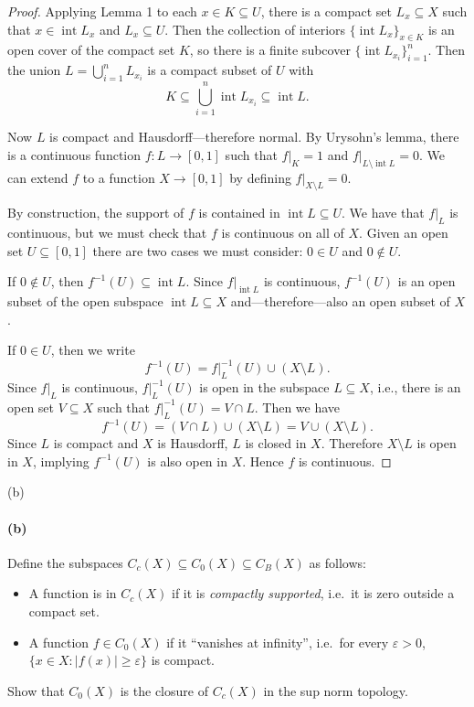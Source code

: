 \documentclass[12pt]{article}
\newlength{\myparskip}
\newenvironment{fullbox}{\begin{lrbox}{\savefullbox}\begin{minipage}{\dimexpr\textwidth-2\fboxsep\relax}\setlength{\parskip}{\myparskip}}{\end{minipage}\end{lrbox}\framebox[\textwidth]{\usebox{\savefullbox}}}
\newenvironment{pbox}[1][]{\begin{fullbox}\ifx#1\empty\else\paragraph{#1}\fi}{\end{fullbox}}
\theoremstyle{definition}
\newcommand{\eps}{\varepsilon}
\newcommand{\<}{\langle}
\renewcommand{\>}{\rangle}
\DeclareMathOperator{\inter}{int}
\begin{document}
\begin{proof}
    Applying Lemma 1 to each $x \in K \subseteq U$, there is a compact set $L_x \subseteq X$ such that $x \in \inter L_x$ and $L_x \subseteq U$.
    Then the collection of interiors $\{\inter L_x\}_{x \in K}$ is an open cover of the compact set $K$, so there is a finite subcover $\{\inter L_{x_i}\}_{i=1}^{n}$.
    Then the union $L = \bigcup_{i=1}^{n} L_{x_i}$ is a compact subset of $U$ with
    \[
        K \subseteq \bigcup_{i=1}^{n} \inter L_{x_i} \subseteq \inter L.
    \]
    
    Now $L$ is compact and Hausdorff---therefore normal.
    By Urysohn's lemma, there is a continuous function $f : L \to [0, 1]$ such that $f|_K = 1$ and $f|_{L \setminus \inter L} = 0$.
    We can extend $f$ to a function $X \to [0, 1]$ by defining $f|_{X \setminus L} = 0$.
    
    By construction, the support of $f$ is contained in $\inter L \subseteq U$.
    We have that $f|_L$ is continuous, but we must check that $f$ is continuous on all of $X$.
    Given an open set $U \subseteq [0, 1]$ there are two cases we must consider: $0 \in U$ and $0 \notin U$.
    
    If $0 \notin U$, then $f^{-1}(U) \subseteq \inter L$.
    Since $f|_{\inter L}$ is continuous, $f^{-1}(U)$ is an open subset of the open subspace $\inter L \subseteq X$ and---therefore---also an open subset of $X$.
    
    If $0 \in U$, then we write
    \[
        f^{-1}(U) = f|_L^{-1}(U) \cup (X \setminus L).
    \]
    Since $f|_L$ is continuous, $f|_L^{-1}(U)$ is open in the subspace $L \subseteq X$, i.e., there is an open set $V \subseteq X$ such that $f|_L^{-1}(U) = V \cap L$.
    Then we have
    \[
        f^{-1}(U)
            = (V \cap L) \cup (X \setminus L)
            = V \cup (X \setminus L).
    \]
    Since $L$ is compact and $X$ is Hausdorff, $L$ is closed in $X$.
    Therefore $X \setminus L$ is open in $X$, implying $f^{-1}(U)$ is also open in $X$. Hence $f$ is continuous.
\end{proof}


\begin{pbox}[(b)]
    Define the subspaces $C_c(X) \subseteq C_0(X) \subseteq C_B(X)$ as
    follows:
    \begin{itemize}
    \item A function is in $C_c(X)$ if it is \emph{compactly supported}, i.e.~it
      is zero outside a compact set.
    \item A function $f \in C_0(X)$ if it ``vanishes at infinity'', i.e.~for
      every $\eps>0$, $\{x \in X: |f(x)| \geq \eps\}$ is compact.
    \end{itemize}
    Show that $C_0(X)$ is the closure of $C_c(X)$ in the sup norm topology.
\end{pbox}
\end{document}
